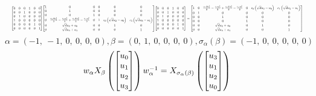 \documentclass[11pt]{article}
\theoremstyle{definition}
\begin{document}
\[
\scaletoalign{\textwidth}{{\left[\begin{matrix}0 & 0 & 0 & 1 & 0 & 0\\0 & 0 & 1 & 0 & 0 & 0\\0 & 1 & 0 & 0 & 0 & 0\\1 & 0 & 0 & 0 & 0 & 0\\0 & 0 & 0 & 0 & 1 & 0\\0 & 0 & 0 & 0 & 0 & 1\end{matrix}\right]} {\left[\begin{matrix}1 & 0 & 0 & 0 & 0 & 0\\0 & 1 & 0 & 0 & 0 & 0\\0 & 0 & 1 & 0 & 0 & 0\\0 & \frac{c_{0} d u_{2}^{2}}{2} - \frac{c_{0} u_{0}^{2}}{2} + \frac{c_{1} d u_{3}^{2}}{2} - \frac{c_{1} u_{1}^{2}}{2} & 0 & 1 & c_{0} \left(\sqrt{d} u_{2} - u_{0}\right) & c_{1} \left(\sqrt{d} u_{3} - u_{1}\right)\\0 & \sqrt{d} u_{2} + u_{0} & 0 & 0 & 1 & 0\\0 & \sqrt{d} u_{3} + u_{1} & 0 & 0 & 0 & 1\end{matrix}\right]} {\left[\begin{matrix}0 & 0 & 0 & 1 & 0 & 0\\0 & 0 & 1 & 0 & 0 & 0\\0 & 1 & 0 & 0 & 0 & 0\\1 & 0 & 0 & 0 & 0 & 0\\0 & 0 & 0 & 0 & 1 & 0\\0 & 0 & 0 & 0 & 0 & 1\end{matrix}\right]} = {\left[\begin{matrix}1 & 0 & \frac{c_{0} d u_{2}^{2}}{2} - \frac{c_{0} u_{0}^{2}}{2} + \frac{c_{1} d u_{3}^{2}}{2} - \frac{c_{1} u_{1}^{2}}{2} & 0 & c_{0} \left(\sqrt{d} u_{2} - u_{0}\right) & c_{1} \left(\sqrt{d} u_{3} - u_{1}\right)\\0 & 1 & 0 & 0 & 0 & 0\\0 & 0 & 1 & 0 & 0 & 0\\0 & 0 & 0 & 1 & 0 & 0\\0 & 0 & \sqrt{d} u_{2} + u_{0} & 0 & 1 & 0\\0 & 0 & \sqrt{d} u_{3} + u_{1} & 0 & 0 & 1\end{matrix}\right]}}
\]
\[
\alpha = \left( -1, \  -1, \  0, \  0, \  0, \  0\right), \beta = \left( 0, \  1, \  0, \  0, \  0, \  0\right), \sigma_{\alpha}(\beta) = \left( -1, \  0, \  0, \  0, \  0, \  0\right)
\]
\[
\scaletoalign{\textwidth}{w_{\alpha} X_{\beta}\left(\left[\begin{matrix}u_{0}\\u_{1}\\u_{2}\\u_{3}\end{matrix}\right]\right) w_{\alpha}^{-1} = X_{\sigma_{\alpha}\left(\beta\right)}\left(\left[\begin{matrix}u_{3}\\u_{1}\\u_{2}\\u_{0}\end{matrix}\right]\right)}
\]
\end{document}
